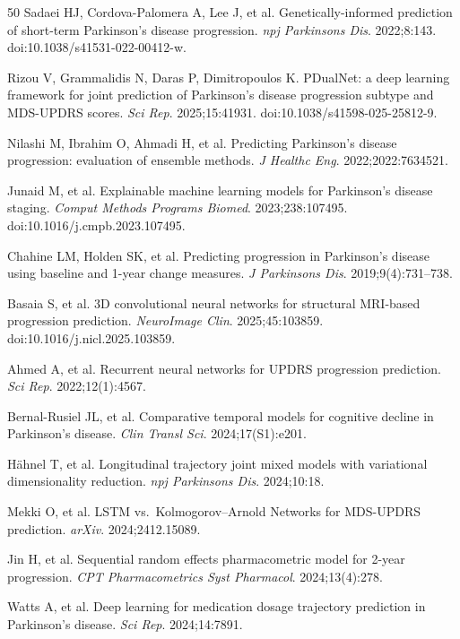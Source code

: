 \documentclass[11pt,a4paper]{article}
\begin{document}
\begin{thebibliography}{50}
Sadaei HJ, Cordova-Palomera A, Lee J, et al.
Genetically-informed prediction of short-term Parkinson's disease progression.
\textit{npj Parkinsons Dis}. 2022;8:143.
doi:10.1038/s41531-022-00412-w.

Rizou V, Grammalidis N, Daras P, Dimitropoulos K.
PDualNet: a deep learning framework for joint prediction of Parkinson's disease progression subtype and MDS-UPDRS scores.
\textit{Sci Rep}. 2025;15:41931.
doi:10.1038/s41598-025-25812-9.

Nilashi M, Ibrahim O, Ahmadi H, et al.
Predicting Parkinson's disease progression: evaluation of ensemble methods.
\textit{J Healthc Eng}. 2022;2022:7634521.

Junaid M, et al.
Explainable machine learning models for Parkinson's disease staging.
\textit{Comput Methods Programs Biomed}. 2023;238:107495.
doi:10.1016/j.cmpb.2023.107495.

Chahine LM, Holden SK, et al.
Predicting progression in Parkinson's disease using baseline and 1-year change measures.
\textit{J Parkinsons Dis}. 2019;9(4):731--738.

Basaia S, et al.
3D convolutional neural networks for structural MRI-based progression prediction.
\textit{NeuroImage Clin}. 2025;45:103859.
doi:10.1016/j.nicl.2025.103859.

Ahmed A, et al.
Recurrent neural networks for UPDRS progression prediction.
\textit{Sci Rep}. 2022;12(1):4567.

Bernal-Rusiel JL, et al.
Comparative temporal models for cognitive decline in Parkinson's disease.
\textit{Clin Transl Sci}. 2024;17(S1):e201.

H\"ahnel T, et al.
Longitudinal trajectory joint mixed models with variational dimensionality reduction.
\textit{npj Parkinsons Dis}. 2024;10:18.

Mekki O, et al.
LSTM vs.\ Kolmogorov--Arnold Networks for MDS-UPDRS prediction.
\textit{arXiv}. 2024;2412.15089.

Jin H, et al.
Sequential random effects pharmacometric model for 2-year progression.
\textit{CPT Pharmacometrics Syst Pharmacol}. 2024;13(4):278.

Watts A, et al.
Deep learning for medication dosage trajectory prediction in Parkinson's disease.
\textit{Sci Rep}. 2024;14:7891.


\end{thebibliography}
\end{document}
